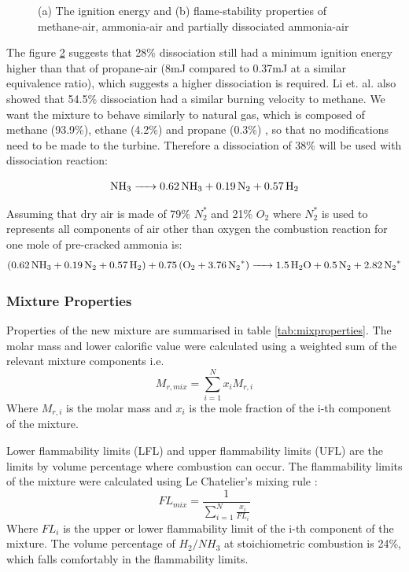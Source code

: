 \documentclass[11pt, oneside]{article}
\begin{document}
\begin{figure} [h]
\begin{subfigure}{.5\textwidth}
  \label{fig:sub2}
\end{subfigure}
\caption{(a) The ignition energy and (b) flame-stability properties of methane-air, ammonia-air and partially dissociated ammonia-air \cite{verkamp}}
\label{fig:mixproperties2}
\end{figure} 

The figure \ref{fig:mixproperties2} suggests that 28\% dissociation still had a minimum ignition energy higher than that of propane-air (8mJ compared to 0.37mJ at a similar equivalence ratio), which suggests a higher dissociation is required. Li et. al. \cite{junLi} also showed that 54.5\% dissociation had a similar burning velocity to methane. We want the mixture to behave similarly to natural gas, which is composed of methane (93.9\%), ethane (4.2\%) and propane (0.3\%) \cite{website:uniongas}, so that no modifications need to be made to the turbine. Therefore a dissociation of 38\% will be used with dissociation reaction:

\begin{equation}
\ce{NH_3 -> 0.62 NH_3 + 0.19 N_2 + 0.57 H_2}
\end{equation}

Assuming that dry air is made of 79\% $N_2^*$ and 21\% $O_2$ where $N_2^*$ is used to represents all components of air other than oxygen the combustion reaction for one mole of pre-cracked ammonia is:
\begin{equation}
\ce{(0.62 NH_3 + 0.19 N_2 + 0.57 H_2) + 0.75(O_2 + 3.76 N_2^*) ->1.5H_2O + 0.5N_2 + 2.82N_2^*}
\end{equation}

\subsubsection {Mixture Properties}
Properties of the new mixture are summarised in table \ref{tab:mixproperties}. The molar mass and lower calorific value were calculated using a weighted sum of the relevant mixture components i.e.
\begin{equation}
M_{r, mix} = \sum_{i=1}^{N} x_i M_{r,i}
\end{equation}
Where $M_{r, i}$ is the molar mass and $x_i$ is the mole fraction of the i-th component of the mixture. 

Lower flammability limits (LFL) and upper flammability limits (UFL) are the limits by volume percentage where combustion can occur. The flammability limits of the mixture were calculated using Le Chatelier's mixing rule \cite{chat}: 
\begin{equation}
FL_{mix} = \frac{1}{\sum_{i=1}^{N} \frac{x_i}{FL_i}}
\end{equation}
Where $FL_{i}$ is the upper or lower flammability limit of the i-th component of the mixture. The volume percentage of $H_2/NH_3$ at stoichiometric combustion is 24\%, which falls comfortably in the flammability limits.
\end{document}
